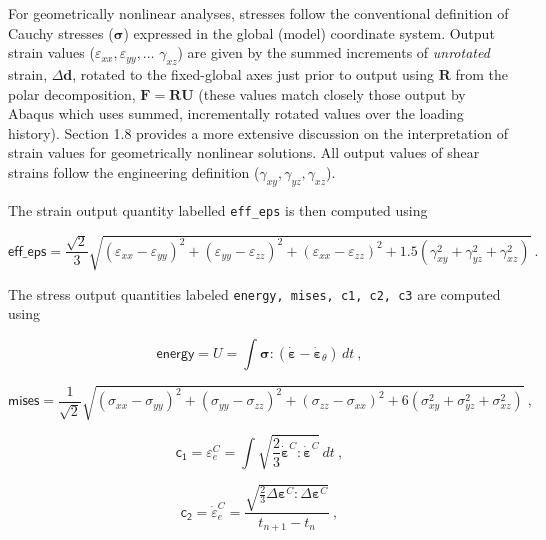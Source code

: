 \documentclass[11pt]{report}
\numberwithin{equation}{section}
\newcommand{\ttt} {\texttt}  %
\newcommand{\bmf } {\boldsymbol }  %
\newcommand{\hv} {\mathsf}   %
\newcommand{\ti}{\emph}
\newcommand{\veps}{\varepsilon}
\newcommand{\noi}{\noindent}
\begin{document}
For geometrically
nonlinear analyses, stresses follow the conventional definition of
Cauchy stresses ($\bmf{\sigma}$) expressed in the global (model) coordinate system.
Output strain values ($\veps_{xx}, \veps_{yy}, \dots $ $\gamma_{xz}$)
are given by the summed increments of 
\ti{unrotated} strain, $\Delta \mathbf{d}$,
rotated to the fixed-global axes just prior to output
using $\mathbf{R}$ from the polar decomposition,
$\mathbf{F}=\mathbf{RU}$ (these values match closely those output by Abaqus 
which uses summed, incrementally rotated values over the loading history). 
Section 1.8 provides a more extensive discussion on the interpretation of strain 
values for geometrically nonlinear solutions. All output values of shear strains
follow the engineering definition ($\gamma_{xy}, \gamma_{yz}, \gamma_{xz}$).

The strain output quantity labelled \ttt{eff\_eps} is then computed using

\small
\begin{equation} \label{eq:eps-eff-output}
\hv{eff\_eps} =\frac{\sqrt{2}}{3} \sqrt{ (\veps_{xx} - \veps_{yy})^2+
(\veps_{yy} - \veps_{zz})^2 +(\veps_{xx }- \veps_{zz})^2
+ 1.5 ( \gamma_{xy}^2 +  \gamma_{yz}^2 + \gamma_{xz}^2)}\ .
\end{equation}
\normalsize

\noi The stress output quantities labeled \ttt{energy, mises, c1, c2, c3} are computed using


\begin{equation} \label{eq:work-output}
      \hv{energy} =U =\int \bm{\sigma}: ( \dot{\bm{\veps}}-\dot{\bm{\veps}}_{\theta})\,dt\ ,
\end{equation}

\begin{equation} \label{eq:mises-output}
\hv{mises} = \frac{1}{\sqrt{2}} \sqrt{(\sigma_{xx} - \sigma_{yy})^2 +
 (\sigma_{yy} - \sigma_{zz})^2 + (\sigma_{zz} - \sigma_{xx})^2 + 
 6(\sigma_{xy}^2 + \sigma_{yz}^2 + \sigma_{xz}^2)} \ ,
\end{equation}


\begin{equation} \label{eq:crp-eps}
    \hv{c_1} =  \veps_e^C=\int\sqrt{{\textstyle\frac{2}{3}}\dot{\bm{\veps}}^C:\dot{\bm{\veps}}^C}\,dt\ ,
\end{equation}

\begin{equation} \label{eq:output-crp-eps-rate}
  \hv{c_2} = \dot  \veps_e^C=\frac{\sqrt{{\textstyle\frac{2}{3}}\Delta{\bm{\veps}}^C:\Delta{\bm{\veps}}^C}}{t_{n+1}-t_n}\ ,
\end{equation}
\end{document}
